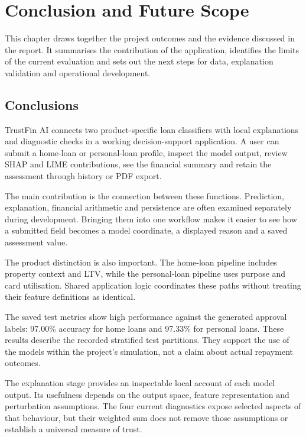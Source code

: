 \chapter[CONCLUSION AND FUTURE SCOPE]{Conclusion and Future Scope}

This chapter draws together the project outcomes and the evidence discussed in the report. It summarises the contribution of the application, identifies the limits of the current evaluation and sets out the next steps for data, explanation validation and operational development.

\section{Conclusions}
TrustFin AI connects two product-specific loan classifiers with local explanations and diagnostic checks in a working decision-support application. A user can submit a home-loan or personal-loan profile, inspect the model output, review SHAP and LIME contributions, see the financial summary and retain the assessment through history or PDF export.

The main contribution is the connection between these functions. Prediction, explanation, financial arithmetic and persistence are often examined separately during development. Bringing them into one workflow makes it easier to see how a submitted field becomes a model coordinate, a displayed reason and a saved assessment value.

The product distinction is also important. The home-loan pipeline includes property context and LTV, while the personal-loan pipeline uses purpose and card utilisation. Shared application logic coordinates these paths without treating their feature definitions as identical.

The saved test metrics show high performance against the generated approval labels: 97.00\% accuracy for home loans and 97.33\% for personal loans. These results describe the recorded stratified test partitions. They support the use of the models within the project's simulation, not a claim about actual repayment outcomes.

The explanation stage provides an inspectable local account of each model output. Its usefulness depends on the output space, feature representation and perturbation assumptions. The four current diagnostics expose selected aspects of that behaviour, but their weighted sum does not remove those assumptions or establish a universal measure of trust.

